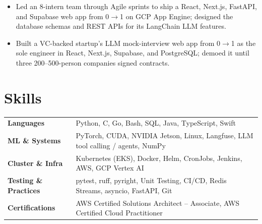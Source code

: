 \documentclass[11pt, letterpaper]{article}
\begin{document}
\vspace{1pt}
\begin{itemize}
  \item Led an 8-intern team through Agile sprints to ship a React, Next.js, FastAPI, and Supabase web app from 0$\to$1 on GCP App Engine; designed the database schemas and REST APIs for its LangChain LLM features.
\end{itemize}

\vspace{1pt}
\begin{itemize}
  \item Built a VC-backed startup's LLM mock-interview web app from 0$\to$1 as the sole engineer in React, Next.js, Supabase, and PostgreSQL; demoed it until three 200--500-person companies signed contracts.
\end{itemize}

\section{Skills}
\begin{tabularx}{\textwidth}{@{}l @{\hspace{7pt}} >{\raggedright\arraybackslash}X@{}}
  \textbf{Languages} & Python, C, Go, Bash, SQL, Java, TypeScript, Swift \\[1pt]
  \textbf{ML \& Systems} & PyTorch, CUDA, NVIDIA Jetson, Linux, Langfuse, LLM tool calling / agents, NumPy \\[1pt]
  \textbf{Cluster \& Infra} & Kubernetes (EKS), Docker, Helm, CronJobs, Jenkins, AWS, GCP Vertex AI \\[1pt]
  \textbf{Testing \& Practices} & pytest, ruff, pyright, Unit Testing, CI/CD, Redis Streams, asyncio, FastAPI, Git \\[1pt]
  \textbf{Certifications} & AWS Certified Solutions Architect -- Associate, AWS Certified Cloud Practitioner \\
\end{tabularx}
\end{document}
